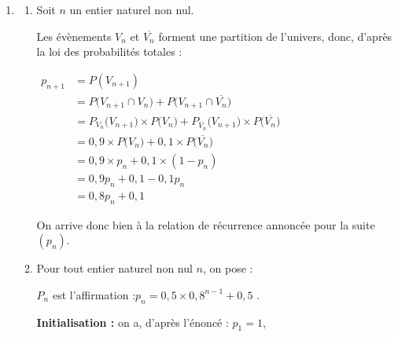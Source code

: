 \documentclass[10pt]{article}
\begin{document}
\begin{enumerate}
\begin{enumerate}
		\item Les évènements $V_2$ et $\overline{V_2}$ partitionnent l'univers, donc, d'après la loi des probabilités totales :

$P(V_3) = P\big(V_3 \cap V_2\big) + P\left(V_3 \cap \overline{V_2}\right) = 0,9 \times 0,9 + 0,1 \times 0,1 = 0,81 + 0,01 = 0,82$.

		On arrive bien à $P(V_3) = 0,82$.

		\item On demande de calculer : $P_{V_3}(V_2)$.

		D'après la définition, on a :\quad $P_{V_3}(V_2) = \dfrac{P(V_3 \cap V_2)}{P(V_3)} = \dfrac{0,9 \times 0,9}{0,82} = \dfrac{81}{82} \approx 0,988$.

		À $10^{-3}$ près, la probabilité que la machine 2 détienne 1, sachant que la machine 3 détient 1 est d'environ 0,988.
	\end{enumerate}

	\item \begin{enumerate}
		\item Soit $n$ un entier naturel non nul.

		Les évènements $V_n$ et $\overline{V_n}$ forment une partition de l'univers, donc, d'après la loi des probabilités totales :

		$\begin{aligned}
			p_{n+1} &= P(V_{n+1}) \\
			&= P\big(V_{n+1} \cap V_n\big) + P\big(V_{n+1} \cap \overline{V_n}\big)\\
			&= P_{V_n}\big(V_{n+1}\big)\times P\big(V_n\big) + P_{\overline{V_n}}\big(V_{n+1}\big)\times P\big(\overline{V_n}\big)\\
			&= 0,9\times P\big(V_n\big) + 0,1 \times  P\big(\overline{V_n}\big)\\
			&= 0,9\times p_n + 0,1 \times  (1 - p_n)\\
			&= 0,9p_n + 0,1 - 0,1 p_n\\
			&= 0,8 p_n + 0,1
		\end{aligned}$

		On arrive donc bien à la relation de récurrence annoncée pour la suite $(p_n)$.

		\item Pour tout entier naturel non nul $n$, on pose :

$P_n$ est l'affirmation :\quad \og $p_n = 0,5\times 0,8^{n-1} + 0,5$ \fg{}.

\textbf{Initialisation :} on a, d'après l'énoncé : \quad $p_1 = 1$,


\end{enumerate}
\end{enumerate}
\end{document}
